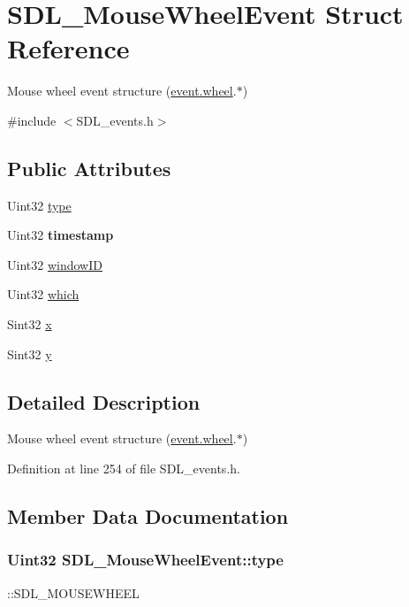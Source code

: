 \hypertarget{structSDL__MouseWheelEvent}{\section{S\+D\+L\+\_\+\+Mouse\+Wheel\+Event Struct Reference}
\label{structSDL__MouseWheelEvent}
}


Mouse wheel event structure (\hyperlink{unionSDL__Event_a267d3f550715519ec90a81ccd0e6cbda}{event.\+wheel}.$\ast$)  




{\ttfamily \#include $<$S\+D\+L\+\_\+events.\+h$>$}

\subsection*{Public Attributes}
\begin{DoxyCompactItemize}
\item 
Uint32 \hyperlink{structSDL__MouseWheelEvent_aa6b741e99df708c6f9550ee0f520fb70}{type}
\item 
\hypertarget{structSDL__MouseWheelEvent_a83ad52c80ff49a8e75dc6c33bba65fa0}{Uint32 {\bfseries timestamp}}\label{structSDL__MouseWheelEvent_a83ad52c80ff49a8e75dc6c33bba65fa0}

\item 
Uint32 \hyperlink{structSDL__MouseWheelEvent_ab45eb1895217214ecb773fc555e08f6c}{window\+I\+D}
\item 
Uint32 \hyperlink{structSDL__MouseWheelEvent_a014dc767d52e8b75ba26a5f12e1704e8}{which}
\item 
Sint32 \hyperlink{structSDL__MouseWheelEvent_a6d904eef474ea45a5b1828fcb5b0f859}{x}
\item 
Sint32 \hyperlink{structSDL__MouseWheelEvent_a53fdf77a464426bc8b30e629795f044b}{y}
\end{DoxyCompactItemize}


\subsection{Detailed Description}
Mouse wheel event structure (\hyperlink{unionSDL__Event_a267d3f550715519ec90a81ccd0e6cbda}{event.\+wheel}.$\ast$) 

Definition at line 254 of file S\+D\+L\+\_\+events.\+h.



\subsection{Member Data Documentation}
\hypertarget{structSDL__MouseWheelEvent_aa6b741e99df708c6f9550ee0f520fb70}{
\subsubsection[{type}]{\setlength{\rightskip}{0pt plus 5cm}Uint32 S\+D\+L\+\_\+\+Mouse\+Wheel\+Event\+::type}}\label{structSDL__MouseWheelEvent_aa6b741e99df708c6f9550ee0f520fb70}
\+::\+S\+D\+L\+\_\+\+M\+O\+U\+S\+E\+W\+H\+E\+E\+L 

